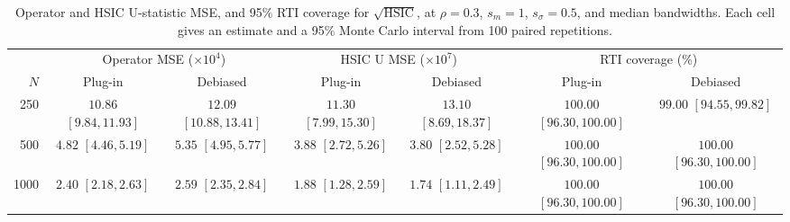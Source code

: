 \begin{table}[htbp]
\centering\small
\caption{Operator and HSIC U-statistic MSE, and 95\% RTI coverage for $\sqrt{\mathrm{HSIC}}$, at $\rho=0.3$, $s_m=1$, $s_\sigma=0.5$, and median bandwidths. Each cell gives an estimate and a 95\% Monte Carlo interval from 100 paired repetitions.}
\label{tab:debiasing-mse-rho0p3}
\setlength{\tabcolsep}{4pt}\renewcommand{\arraystretch}{1.3}
\begin{tabular}{@{}rcccccc@{}}\toprule
& \multicolumn{2}{c}{Operator MSE ($\times 10^{4}$)} & \multicolumn{2}{c}{HSIC U MSE ($\times 10^{7}$)} & \multicolumn{2}{c}{RTI coverage (\%)}\\
\cmidrule(lr){2-3}\cmidrule(lr){4-5}\cmidrule(l){6-7}
$N$ & Plug-in & Debiased & Plug-in & Debiased & Plug-in & Debiased\\\midrule
250 & \shortstack{$10.86$\\{\scriptsize $[9.84,11.93]$}} & \shortstack{$12.09$\\{\scriptsize $[10.88,13.41]$}} & \shortstack{$11.30$\\{\scriptsize $[7.99,15.30]$}} & \shortstack{$13.10$\\{\scriptsize $[8.69,18.37]$}} & \shortstack{$100.00$\\{\scriptsize $[96.30,100.00]$}} & \shortstack{$99.00$\\{\scriptsize $[94.55,99.82]$}}\\[3pt]
500 & \shortstack{$4.82$\\{\scriptsize $[4.46,5.19]$}} & \shortstack{$5.35$\\{\scriptsize $[4.95,5.77]$}} & \shortstack{$3.88$\\{\scriptsize $[2.72,5.26]$}} & \shortstack{$3.80$\\{\scriptsize $[2.52,5.28]$}} & \shortstack{$100.00$\\{\scriptsize $[96.30,100.00]$}} & \shortstack{$100.00$\\{\scriptsize $[96.30,100.00]$}}\\[3pt]
1000 & \shortstack{$2.40$\\{\scriptsize $[2.18,2.63]$}} & \shortstack{$2.59$\\{\scriptsize $[2.35,2.84]$}} & \shortstack{$1.88$\\{\scriptsize $[1.28,2.59]$}} & \shortstack{$1.74$\\{\scriptsize $[1.11,2.49]$}} & \shortstack{$100.00$\\{\scriptsize $[96.30,100.00]$}} & \shortstack{$100.00$\\{\scriptsize $[96.30,100.00]$}}\\[3pt]
\bottomrule\end{tabular}
\end{table}

